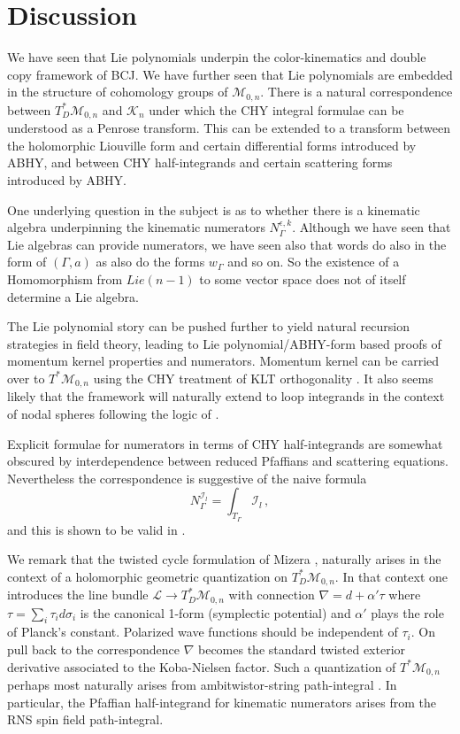 \documentclass[11pt]{article}
\newcommand{\cK}{\mathcal{K}}
\newcommand{\cI}{\mathcal{I}}
\newcommand{\cL}{\mathcal{L}}
\newcommand{\cM}{\mathcal{M}}
\newcommand{\1}{{\rm 1\hskip-0.25em I}}
\begin{document}
\section{Discussion}
We have seen that Lie polynomials underpin the color-kinematics and double copy framework of BCJ.  We have further seen that Lie polynomials are embedded in the structure of cohomology groups of  $\cM_{0,n}$. There is a natural correspondence between $T^*_D\cM_{0,n}$ and $\cK_n$ under which the CHY integral formulae can be understood as a Penrose transform.  This can be extended to a transform between the holomorphic Liouville form and certain differential forms introduced by ABHY, and between CHY half-integrands and certain scattering forms introduced by ABHY.

One underlying question in the subject is as to whether there is a kinematic algebra underpinning the kinematic numerators $N_\Gamma^{\epsilon,k}$.  Although we have seen that Lie algebras can provide numerators, we have seen also that words do also in the form of $(\Gamma,a)$ as also do the forms $w_\Gamma$ and so on.  So the existence of a Homomorphism from $Lie(n-1)$ to some vector space does not of itself determine a Lie algebra.  



The Lie polynomial story can be pushed further to yield natural recursion strategies in field theory, leading to Lie polynomial/ABHY-form based proofs of momentum kernel properties and numerators.  Momentum kernel can be carried over to $T^*\cM_{0,n}$ using the CHY treatment of KLT orthogonality \cite{Cachazo:2013gna}.  It also seems likely that the framework will naturally extend to loop integrands in the context of nodal spheres following the logic of \cite{Geyer:2015bja}. 


 Explicit formulae for numerators  in terms of CHY half-integrands are somewhat  obscured by interdependence between reduced Pfaffians and scattering equations.  Nevertheless the  correspondence is suggestive of the
 naive formula
\begin{equation}
N^{\cI_l}_\Gamma=\int_{T_\Gamma}\cI_l\, ,
\end{equation}
and this is shown to be valid in \cite{Mizera:2019n}. 

We remark that the twisted cycle formulation of Mizera \cite{Mizera:2019gea}, naturally arises in the context of a holomorphic  geometric quantization on $T^*_D\cM_{0,n}$.  In that context one introduces the line bundle $\cL\rightarrow T^*_D\cM_{0,n}$ with connection $\nabla=d+ \alpha'\tau $  where $\tau=\sum_i \tau_i d\sigma_i$ is the canonical 1-form (symplectic potential) and $\alpha'$ plays the role of Planck's constant. Polarized wave functions should be independent of $\tau_i$.  On pull back to the correspondence $\nabla $ becomes the standard twisted exterior derivative associated to the Koba-Nielsen factor. 
Such a 
quantization of $T^*\cM_{0,n}$ perhaps most naturally arises from ambitwistor-string path-integral \cite{Mason:2013sva}. In particular, the Pfaffian half-integrand for kinematic numerators arises from the RNS spin field path-integral.
\end{document}

